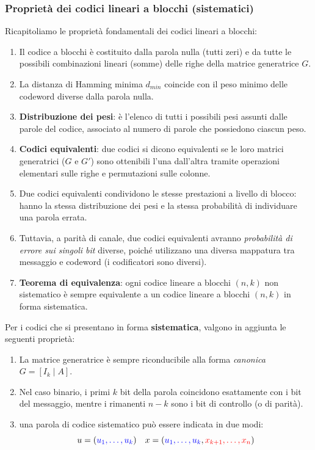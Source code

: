 \subsubsection{Proprietà dei codici lineari a blocchi (sistematici)}
Ricapitoliamo le proprietà fondamentali dei codici lineari a blocchi:
\begin{enumerate}
    \item Il codice a blocchi è costituito dalla parola nulla (tutti zeri) e da tutte le possibili combinazioni lineari (somme) delle righe della matrice generatrice $G$.
    \item La distanza di Hamming minima $d_{min}$ coincide con il peso minimo delle codeword diverse dalla parola nulla.
    \item \textbf{Distribuzione dei pesi}: è l'elenco di tutti i possibili pesi assunti dalle parole del codice, associato al numero di parole che possiedono ciascun peso.
    \item \textbf{Codici equivalenti}: due codici si dicono equivalenti se le loro matrici generatrici ($G$ e $G'$) sono ottenibili l'una dall'altra tramite operazioni elementari sulle righe e permutazioni sulle colonne.
    \item Due codici equivalenti condividono le stesse prestazioni a livello di blocco: hanno la stessa distribuzione dei pesi e la stessa probabilità di individuare una parola errata.
    \item Tuttavia, a parità di canale, due codici equivalenti avranno \textit{probabilità di errore sui singoli bit} diverse, poiché utilizzano una diversa mappatura tra messaggio e codeword (i codificatori sono diversi).
    \item \textbf{Teorema di equivalenza}: ogni codice lineare a blocchi $(n,k)$ non sistematico è sempre equivalente a un codice lineare a blocchi $(n,k)$ in forma sistematica.
\end{enumerate}

Per i codici che si presentano in forma \textbf{sistematica}, valgono in aggiunta le seguenti proprietà:
\begin{enumerate}
    \item La matrice generatrice è sempre riconducibile alla forma \textit{canonica} $G = [I_k \mid A]$.
    \item Nel caso binario, i primi $k$ bit della parola coincidono esattamente con i bit del messaggio, mentre i rimanenti $n-k$ sono i bit di controllo (o di parità).
    \item una parola di codice sistematico può essere indicata in due modi:
    \[u=(\textcolor{blue}{u_1,\dots,u_k}) \quad x=(\textcolor{blue}{u_1,\dots,u_k},\textcolor{red}{x_{k+1},\dots,x_n})\]
\end{enumerate}

